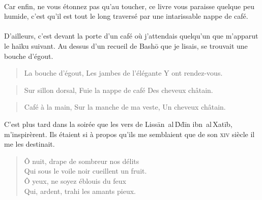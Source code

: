 \paragraph{}
\begin{prose}
Car enfin, ne vous étonnez pas qu’au toucher, ce livre vous paraisse quelque peu humide, c’est qu’il est tout le long traversé par une intarissable nappe de café.
\end{prose}

\paragraph{}
\begin{prose}
D’ailleurs, c’est devant la porte d’un café où j’attendais quelqu’un que m’apparut le haïku suivant. Au dessus d’un recueil de Bashō que je lisais, se trouvait une bouche d’égout.
\end{prose}

\begin{verse}
La bouche d’égout,
Les jambes de l’élégante
Y ont rendez-vous.
\end{verse}

\begin{verse}
Sur sillon dorsal,
Fuie la nappe de café
Des cheveux châtain.
\end{verse}

\begin{verse}
Café à la main,
Sur la manche de ma veste,
Un cheveux châtain.
\end{verse}

\begin{prose}
C’est plus tard dans la soirée que les vers de Lissān~al\,Ḋḋīn ibn~al\,Xatīb, m’inspirèrent. Ils étaient si à propos qu’ils me semblaient que de son \textsc{xiv}\ieme{} siècle il me les destinait.
\end{prose}

\begin{verse}
Ô nuit, drape de sombreur nos délits\\
Qui sous le voile noir cueillent un fruit.\\
Ô yeux\label{foot.vocaliseYeuxNuit}, ne soyez  éblouis du feux\\
Qui, ardent, trahi les amants pieux.
\end{verse}

